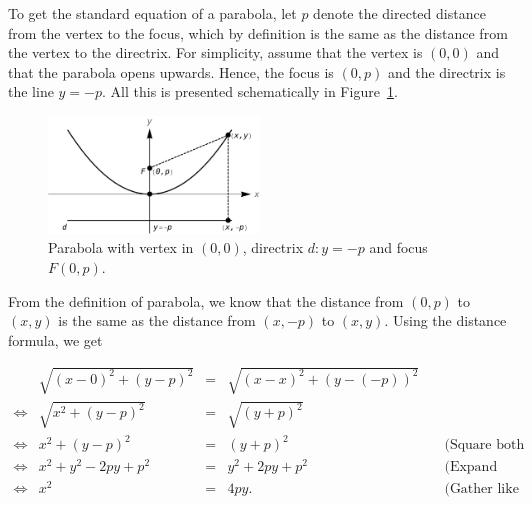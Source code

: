 \ifvc
To get the standard equation of a parabola, let $p$ denote the directed distance from the vertex to the focus, which by definition is the same as the distance from the vertex to the directrix.  For simplicity, assume that the vertex is $(0,0)$ and that the parabola opens upwards.  Hence, the focus is $(0,p)$ and the directrix is the line $y = -p$. All this is presented schematically in Figure~\ref{fig_algebraic_27}.
\fi

\begin{figure}[h]
	\begin{center}
			\includegraphics[width=0.5\textwidth]{fig_algebraic_27}
	\caption{Parabola with vertex in $(0,0)$, directrix $d: y=-p$ and focus $F (0,p)$.}
	\label{fig_algebraic_27}
	\end{center}
\end{figure}

\ifcourse
\ifanalysis
	\checkoddpage
{}
 \fi
From the definition of parabola, we know that the distance from $(0,p)$ to $(x,y)$ is the same as the distance from $(x,-p)$ to $(x,y)$.  Using the distance formula, we get

\[ \begin{array}{rrclr} 
&\sqrt{(x -0)^2 + (y-p)^2} & = & \sqrt{(x-x)^2 + (y - (-p))^2} & \\
\Leftrightarrow&\sqrt{x^2 + (y-p)^2} & = & \sqrt{(y+p)^2} & \\
\Leftrightarrow&x^2 + (y-p)^2 & = & (y+p)^2 & \quad\mbox{(Square both sides.)} \\
\Leftrightarrow&x^2 + y^2 - 2py + p^2 & = & y^2 + 2py + p^2 & \quad\mbox{(Expand quantities.)} \\
\Leftrightarrow&x^2 & = & 4py. & \quad\mbox{(Gather like terms.)} \\ \end{array} \]
\fi

